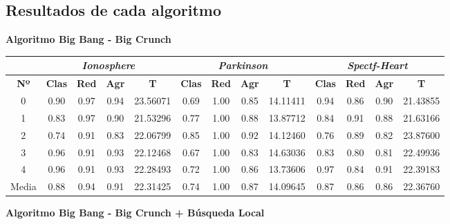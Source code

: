 \documentclass[10pt, a4paper]{article}
\theoremstyle{theorem-style}
\theoremstyle{theorem-style}
\theoremstyle{theorem2-style}
\theoremstyle{definition-style}
\theoremstyle{remark-style}
\theoremstyle{example-style}
\theoremstyle{definition-style}
\theoremstyle{remark-style}
\theoremstyle{remark-style}
\begin{document}
\subsection{Resultados de cada algoritmo}

\textbf{Algoritmo Big Bang - Big Crunch}

\begin{table}[ht!]
\begin{tabular}{ccccc|cccc|cccc}
\centering
 & \multicolumn{4}{c}{\textit{Ionosphere}} & \multicolumn{4}{c}{\textit{Parkinson}} & \multicolumn{4}{c}{\textit{Spectf-Heart}} \\ \hline
\textbf{Nº} & \textbf{Clas} & \textbf{Red} & \textbf{Agr} & \textbf{T} & \textbf{Clas} & \textbf{Red} & \textbf{Agr} & \textbf{T} & \textbf{Clas} & \textbf{Red} & \textbf{Agr} & \textbf{T} \\ \hline
0&	 0.90 & 0.97 & 0.94 & 23.56071 & 	0.69 & 1.00 & 0.85 & 14.11411 & 0.94 & 0.86 & 0.90 & 21.43855 \\ 
1&	 0.83 & 0.97 & 0.90 & 21.53296 & 	0.77 & 1.00 & 0.88 & 13.87712 & 0.84 & 0.91 & 0.88 & 21.63166 \\ 
2&	 0.74 & 0.91 & 0.83 & 22.06799 & 	0.85 & 1.00 & 0.92 & 14.12460 & 0.76 & 0.89 & 0.82 & 23.87600 \\ 
3&	 0.96 & 0.91 & 0.93 & 22.12468 & 	0.67 & 1.00 & 0.83 & 14.63036 & 0.83 & 0.80 & 0.81 & 22.49936 \\ 
4&	 0.96 & 0.91 & 0.93 & 22.28493 & 	0.72 & 1.00 & 0.86 & 13.73606 & 0.97 & 0.84 & 0.91 & 22.39183 \\ 
\hline
Media&	 0.88 & 0.94 & 0.91 & 22.31425 &	0.74 & 1.00 & 0.87 & 14.09645 &		0.87 & 0.86 & 0.86 & 22.36760
 \\
\end{tabular}
\end{table}

\textbf{Algoritmo Big Bang - Big Crunch + Búsqueda Local}
\end{document}
